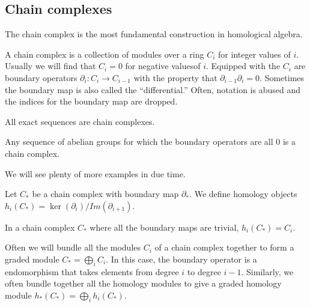 \subsection{Chain complexes}
The chain complex is the most fundamental construction in
homological algebra.
\begin{definition} A chain complex is a collection of modules
over a ring $C_i$
for integer values of $i$. Usually we will find that $C_i=0$ for
negative valuesof $i$. Equipped with the $C_i$ are boundary
operators
$\partial_i:C_i\rightarrow C_{i-1}$ with the property that
$\partial_{i-1}\partial_i=0$. Sometimes the boundary map is also
called the
``differential.'' Often, notation is abused and the indices for
the boundary map are dropped.\end{definition}
\begin{example} All exact sequences are chain complexes.
\end{example}
\begin{example} Any sequence of abelian groups for which the
boundary operators
are all $0$ is a chain complex. \end{example}
We will see plenty of more examples in due time.
\begin{definition} Let $C_*$ be a chain complex with boundary
map $\partial_*$.
We define homology objects
$h_i(C_*)=\ker(\partial_i)/Im(\partial_{i+1})$.
\end{definition}
\begin{example} In a chain complex $C_*$ where all the boundary
maps are
trivial, $h_i(C_*)=C_i$. \end{example}

Often we will bundle all the modules $C_i$ of a chain complex
together to form a graded module $C_*=\bigoplus_i C_i$. In this
case, the boundary operator is a
endomorphism that takes elements from degree $i$ to degree
$i-1$. Similarly, we
often bundle together all the homology modules to give a graded
homology module
$h_*(C_*)=\bigoplus_i h_i(C_*)$.

